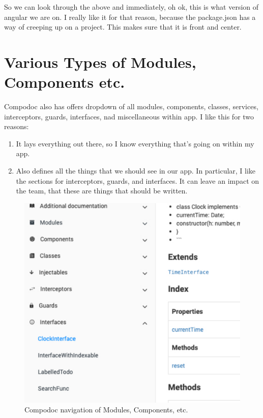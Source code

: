 So we can look through the above and immediately, oh ok, this is what version of angular we are on. I really like it for that reason, because the package.json has a way of creeping up on a project. This makes sure that it is front and center. 

\section{Various Types of Modules, Components etc.}
Compodoc also has offers dropdown of all modules, components, classes, services, interceptors, guards, interfaces, nad miscellaneous within app. I like this for two reasons: 
\begin{enumerate}
  \item It lays everything out there, so I know everything that's going on within my app.
  \item Also defines all the things that we should see in our app. In particular, I like the sections for interceptors, guards, and interfaces. It can leave an impact on the team, that these are things that should be written.
\end{enumerate}

\begin{figure}[h!]
\caption{Compodoc navigation of Modules, Components, etc.}
\includegraphics[width=414pt]{graphics/compodoc/nav/compodoc-nav-screenshot.pdf}
\end{figure}

